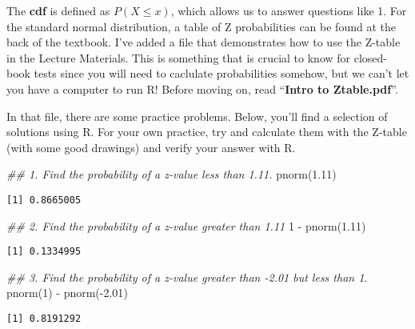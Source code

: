 \documentclass[
  letterpaper,
  DIV=11,
  numbers=noendperiod]{scrreprt}
\newenvironment{Shaded}{\begin{snugshade}}{\end{snugshade}}
\newcommand{\DecValTok}[1]{\textcolor[rgb]{0.68,0.00,0.00}{#1}}
\newcommand{\DocumentationTok}[1]{\textcolor[rgb]{0.37,0.37,0.37}{\textit{#1}}}
\newcommand{\FloatTok}[1]{\textcolor[rgb]{0.68,0.00,0.00}{#1}}
\newcommand{\FunctionTok}[1]{\textcolor[rgb]{0.28,0.35,0.67}{#1}}
\newcommand{\NormalTok}[1]{\textcolor[rgb]{0.00,0.23,0.31}{#1}}
\newcommand{\SpecialCharTok}[1]{\textcolor[rgb]{0.37,0.37,0.37}{#1}}
\begin{document}
The \textbf{cdf} is defined as \(P(X\le x)\), which allows us to answer
questions like 1. For the standard normal distribution, a table of Z
probabilities can be found at the back of the textbook. I've added a
file that demonstrates how to use the Z-table in the Lecture Materials.
This is something that is crucial to know for closed-book tests since
you will need to caclulate probabilities somehow, but we can't let you
have a computer to run R! Before moving on, read ``\textbf{Intro to
Ztable.pdf}''.

In that file, there are some practice problems. Below, you'll find a
selection of solutions using R. For your own practice, try and calculate
them with the Z-table (with some good drawings) and verify your answer
with R.

\begin{Shaded}
\begin{Highlighting}[]
\DocumentationTok{\#\# 1. Find the probability of a z{-}value less than 1.11.}
\FunctionTok{pnorm}\NormalTok{(}\FloatTok{1.11}\NormalTok{)}
\end{Highlighting}
\end{Shaded}

\begin{verbatim}
[1] 0.8665005
\end{verbatim}

\begin{Shaded}
\begin{Highlighting}[]
\DocumentationTok{\#\# 2. Find the probability of a z{-}value greater than 1.11}
\DecValTok{1} \SpecialCharTok{{-}} \FunctionTok{pnorm}\NormalTok{(}\FloatTok{1.11}\NormalTok{)}
\end{Highlighting}
\end{Shaded}

\begin{verbatim}
[1] 0.1334995
\end{verbatim}

\begin{Shaded}
\begin{Highlighting}[]
\DocumentationTok{\#\# 3. Find the probability of a z{-}value greater than {-}2.01 but less than 1.}
\FunctionTok{pnorm}\NormalTok{(}\DecValTok{1}\NormalTok{) }\SpecialCharTok{{-}} \FunctionTok{pnorm}\NormalTok{(}\SpecialCharTok{{-}}\FloatTok{2.01}\NormalTok{)}
\end{Highlighting}
\end{Shaded}

\begin{verbatim}
[1] 0.8191292
\end{verbatim}
\end{document}
